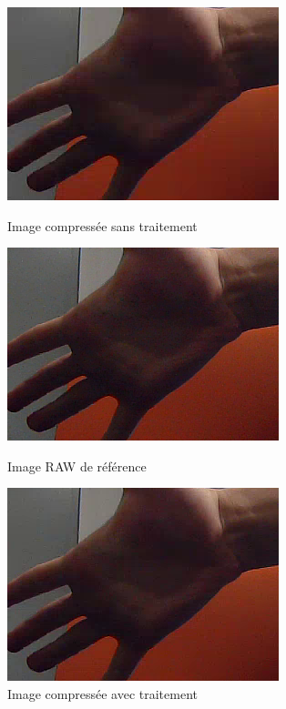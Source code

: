 \documentclass[11pt,a4paper]{article}
\begin{document}
\begin{figure}[!htb]
  \includegraphics[width=\linewidth]{images/comparaison_zoom_normal.png}
  \caption{Image compressée sans traitement}
\endminipage\hfill
{}
  \includegraphics[width=\linewidth]{images/comparaison_zoom_raw.png}
  \caption{Image RAW de référence\newline}
\endminipage\hfill
{}
  \includegraphics[width=\linewidth]{images/comparaison_zoom_snr.png}
  \caption{Image compressée avec traitement}
\endminipage
\end{figure}
\end{document}
